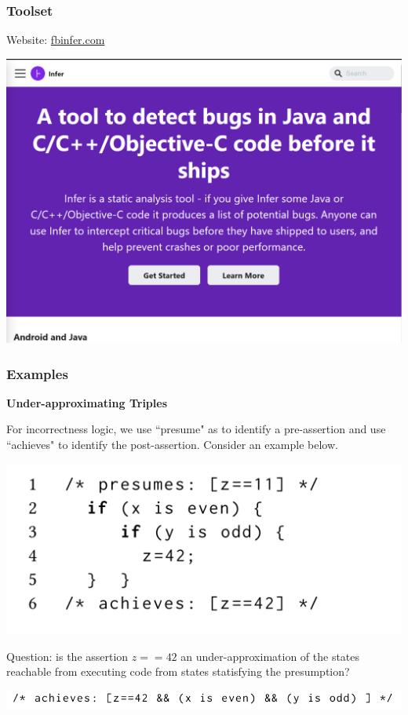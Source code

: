 \documentclass[11pt]{beamer}
\begin{document}
\begin{frame}\frametitle{Toolset}

Website: \underline{fbinfer.com}
\begin{center}
\includegraphics[scale=0.35]{infer.png}

\end{center}

\end{frame}

\begin{frame}\frametitle{Examples}
\textbf{Under-approximating Triples}

For incorrectness logic, we use ``presume" as to identify a pre-assertion and use ``achieves" to identify the post-assertion. Consider an example below.
\begin{center}
\includegraphics[scale = 0.25]{4.png}

\end{center}
Question: is the assertion $z==42$ an under-approximation of the states reachable from executing code from states statisfying the presumption?
\begin{center}
\includegraphics[scale = 0.35]{3.png}
\end{center}
\end{frame}
\end{document}
